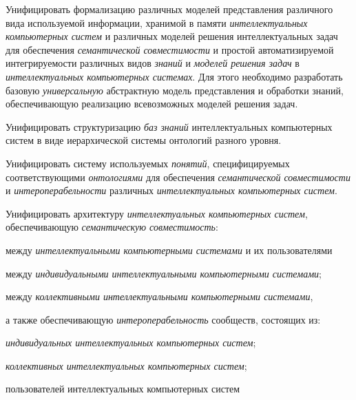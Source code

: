 \begin{textitemize}
	\item  Унифицировать формализацию различных моделей представления различного вида используемой информации, хранимой в памяти \textit{интеллектуальных компьютерных систем} и различных моделей решения интеллектуальных задач для обеспечения \textit{семантической совместимости} и простой автоматизируемой интегрируемости различных видов \textit{знаний} и \textit{моделей решения задач} в \textit{интеллектуальных компьютерных системах}. Для этого необходимо разработать базовую \textit{универсальную} абстрактную модель представления и обработки знаний, обеспечивающую реализацию всевозможных моделей решения задач.
	
	\item  Унифицировать структуризацию \textit{баз знаний} интеллектуальных компьютерных систем в виде иерархической системы онтологий разного уровня.
	
	\item  Унифицировать систему используемых \textit{понятий}, специфицируемых соответствующими \textit{онтологиями} для обеспечения \textit{семантической совместимости} и \textit{интероперабельности} различных \textit{интеллектуальных компьютерных систем}.
	
	\item  Унифицировать архитектуру \textit{интеллектуальных компьютерных систем}, обеспечивающую \textit{семантическую совместимость}:
	
	\begin{textitemize}
		\item между \textit{интеллектуальными компьютерными системами} и их пользователями
		\item между \textit{индивидуальными интеллектуальными компьютерными системами};
		\item между \textit{коллективными интеллектуальными компьютерными системами},
	\end{textitemize}
	
	а также обеспечивающую \textit{интероперабельность} сообществ, состоящих из:
	
	\begin{textitemize}
		\item \textit{индивидуальных интеллектуальных компьютерных систем};
		\item \textit{коллективных интеллектуальных компьютерных систем};
		\item пользователей интеллектуальных компьютерных систем
	\end{textitemize}
	

\end{textitemize}
